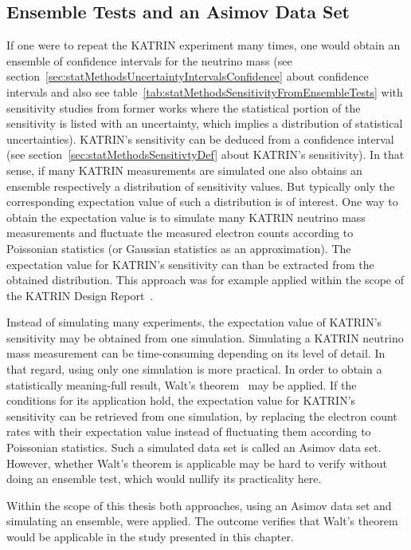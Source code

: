 \subsection{Ensemble Tests and an Asimov Data Set}
\label{sec:katrinElossStatisticsAsimov}
If one were to repeat the KATRIN experiment many times, one would obtain an ensemble of confidence intervals for the neutrino mass (see section~\ref{sec:statMethodsUncertaintyIntervalsConfidence} about confidence intervals and also see table~\ref{tab:statMethodsSensitivityFromEnsembleTests} with sensitivity studies from former works where the statistical portion of the sensitivity is listed with an uncertainty, which implies a distribution of statistical uncertainties). KATRIN's sensitivity can be deduced from a confidence interval (see section~\ref{sec:statMethodsSensitivtyDef} about KATRIN's sensitivity). In that sense, if many KATRIN measurements are simulated one also obtains an ensemble respectively a distribution of sensitivity values. But typically only the corresponding expectation value of such a distribution is of interest. One way to obtain the expectation value is to simulate many KATRIN neutrino mass measurements and fluctuate the measured electron counts according to Poissonian statistics (or Gaussian statistics as an approximation). The expectation value for KATRIN's sensitivity can than be extracted from the obtained distribution. This approach was for example applied within the scope of the KATRIN Design Report~\cite{Angrik:2005ep}. 

Instead of simulating many experiments, the expectation value of KATRIN's sensitivity may be obtained from one simulation. Simulating a KATRIN neutrino mass measurement can be time-consuming depending on its level of detail. In that regard, using only one simulation is more practical. In order to obtain a statistically meaning-full result, Walt's theorem~\cite{Wald1944} may be applied. If the conditions for its application hold, the expectation value for KATRIN's sensitivity can be retrieved from one simulation, by replacing the electron count rates with their expectation value instead of fluctuating them according to Poissonian statistics. Such a simulated data set is called an Asimov data set. However, whether Walt's theorem is applicable may be hard to verify without doing an ensemble test, which would nullify its practicality here.

Within the scope of this thesis both approaches, using an Asimov data set and simulating an ensemble, were applied. The outcome verifies that Walt's theorem would be applicable in the study presented in this chapter.